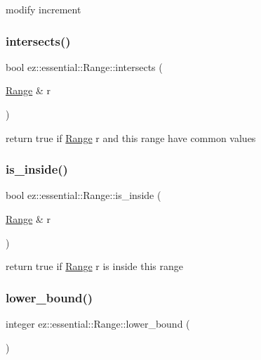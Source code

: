 modify increment \mbox{\label{classez_1_1essential_1_1Range_aaf3723436b1129886589642f4b49213b}} 
\subsubsection{\texorpdfstring{intersects()}{intersects()}}
{\footnotesize\ttfamily bool ez\+::essential\+::\+Range\+::intersects (\begin{DoxyParamCaption}\item[{\hyperlink{classez_1_1essential_1_1Range}{Range} \&}]{r }\end{DoxyParamCaption})\hspace{0.3cm}{\ttfamily [inline]}}

return true if \hyperlink{classez_1_1essential_1_1Range}{Range} r and this range have common values \mbox{\label{classez_1_1essential_1_1Range_aef949951451297fd3e9d96f8cd773e97}} 
\subsubsection{\texorpdfstring{is\+\_\+inside()}{is\_inside()}}
{\footnotesize\ttfamily bool ez\+::essential\+::\+Range\+::is\+\_\+inside (\begin{DoxyParamCaption}\item[{\hyperlink{classez_1_1essential_1_1Range}{Range} \&}]{r }\end{DoxyParamCaption})\hspace{0.3cm}{\ttfamily [inline]}}

return true if \hyperlink{classez_1_1essential_1_1Range}{Range} r is inside this range \mbox{\label{classez_1_1essential_1_1Range_a7ac883fa331366305a79b41a08d6e54f}} 
\subsubsection{\texorpdfstring{lower\+\_\+bound()}{lower\_bound()}\hspace{0.1cm}{\footnotesize\ttfamily [1/2]}}
{\footnotesize\ttfamily integer ez\+::essential\+::\+Range\+::lower\+\_\+bound (\begin{DoxyParamCaption}{ }\end{DoxyParamCaption})\hspace{0.3cm}{\ttfamily [inline]}}

